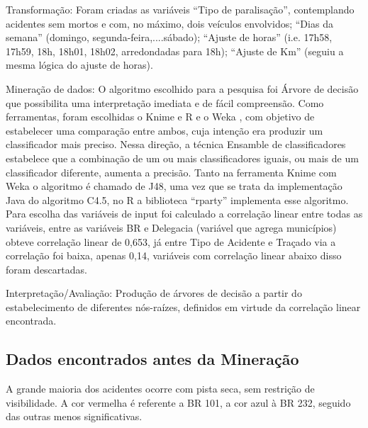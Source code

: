 Transformação: Foram criadas as variáveis “Tipo de
paralisação”, contemplando acidentes sem mortos e com, no
máximo, dois veículos envolvidos; “Dias da semana”
(domingo, segunda-feira,....sábado); “Ajuste de horas” (i.e. 17h58, 17h59, 18h, 18h01, 18h02, arredondadas para 18h);
“Ajuste de Km” (seguiu a mesma lógica do ajuste de horas).

Mineração de dados: O algoritmo escolhido para a pesquisa
foi Árvore de decisão que possibilita uma interpretação
imediata e de fácil compreensão. Como ferramentas, foram
escolhidas o Knime \cite{Knime} e R \cite{R-cran} e o Weka \cite{Weka}, com objetivo
de estabelecer uma comparação entre ambos, cuja intenção era
produzir um classificador mais preciso. Nessa direção, a
técnica Ensamble de classificadores \cite{Bernardini} estabelece que a
combinação de um ou mais classificadores iguais, ou mais de
um classificador diferente, aumenta a precisão. Tanto na
ferramenta Knime com Weka o algoritmo é chamado de J48,
uma vez que se trata da implementação Java do algoritmo
C4.5, no R a biblioteca “rparty” implementa esse algoritmo.
Para escolha das variáveis de input foi calculado a correlação
linear entre todas as variáveis, entre as variáveis BR e
Delegacia (variável que agrega municípios) obteve correlação
linear de 0,653, já entre Tipo de Acidente e Traçado via a
correlação foi baixa, apenas 0,14, variáveis com correlação
linear abaixo disso foram descartadas.

Interpretação/Avaliação: Produção de árvores de decisão a
partir do estabelecimento de diferentes nós-raízes, definidos em
virtude da correlação linear encontrada.

\pagebreak

\subsection{Dados encontrados antes da Mineração}

A grande maioria dos acidentes ocorre com pista seca, sem restrição de visibilidade. 
A cor vermelha é referente a BR 101, a cor azul à BR 232, seguido das outras menos significativas.

